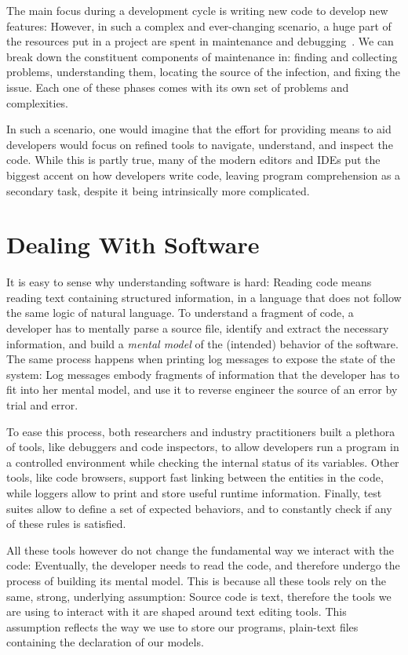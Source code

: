 The main focus during a development cycle is writing new code to develop new features: However, in such a complex and ever-changing scenario, a huge part of the resources put in a project are spent in maintenance and debugging~\cite{Corb1989,Fjel1983,Zelk1979,Mine2015b}.
We can break down the constituent components of maintenance in: finding and collecting problems, understanding them, locating the source of the infection, and fixing the issue.
Each one of these phases comes with its own set of problems and complexities.

In such a scenario, one would imagine that the effort for providing means to aid developers would focus on refined tools to navigate, understand, and inspect the code.
While this is partly true, many of the modern editors and IDEs put the biggest accent on how developers write code, leaving program comprehension as a secondary task, despite it being intrinsically more complicated.


\section{Dealing With Software}

It is easy to sense why understanding software is hard: Reading code means reading text containing structured information, in a language that does not follow the same logic of natural language.
To understand a fragment of code, a developer has to mentally parse a source file, identify and extract the necessary information, and build a \emph{mental model} of the (intended) behavior of the software.
The same process happens when printing log messages to expose the state of the system: Log messages embody fragments of information that the developer has to fit into her mental model, and use it to reverse engineer the source of an error by trial and error.

To ease this process, both researchers and industry practitioners built a plethora of tools, like debuggers and code inspectors, to allow developers run a program in a controlled environment while checking the internal status of its variables.
Other tools, like code browsers, support fast linking between the entities in the code, while loggers allow to print and store useful runtime information.
Finally, test suites allow to define a set of expected behaviors, and to constantly check if any of these rules is satisfied.

All these tools however do not change the fundamental way we interact with the code: Eventually, the developer needs to read the code, and therefore undergo the process of building its mental model.
This is because all these tools rely on the same, strong, underlying assumption: Source code is text, therefore the tools we are using to interact with it are shaped around text editing tools.
This assumption reflects the way we use to store our programs, \ie plain-text files containing the declaration of our models.

